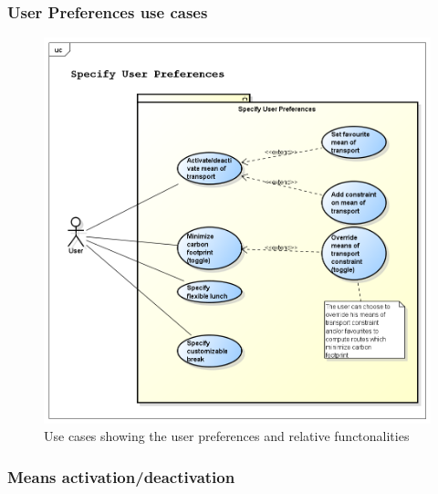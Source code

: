 \newpage
\subsubsection{User Preferences use cases}
\begin{figure}[htp]
\includegraphics[width=\textwidth]{usecases/png/specifyuserpreferences} 
\caption{Use cases showing the user preferences and relative functonalities} 
\label{fig:specifyuserpreferences} 
\end{figure}

\newpage
\subsubsection{Means activation/deactivation}



